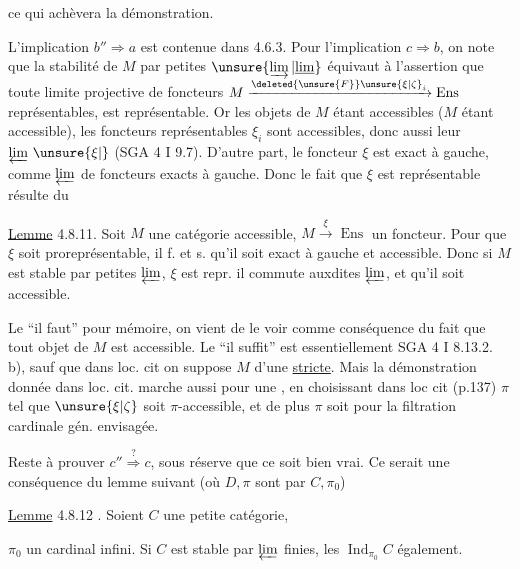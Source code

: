 ce qui achèvera la démonstration.

L'implication $b''\Longrightarrow a$ est contenue dans 4.6.3. Pour l'implication $c\Longrightarrow b$, on note que la stabilité de  $M$ par petites $\unsure{\varinjlim|\underline{\lim}}$ équivaut à l'assertion que toute  limite projective \deleted{$\unsure{\xi}$} de foncteurs $M\xrightarrow{\deleted{\unsure{F}}\unsure{\xi|\zeta}_i}\operatorname{Ens}$ représentables, est représentable. Or les objets de $M$ étant accessibles ($M$ étant accessible), les foncteurs représentables $\xi_i$ sont accessibles, donc aussi leur $\varprojlim\,\unsure{\xi|{}}$ (SGA 4 I 9.7). D'autre part, le foncteur $\xi$ est exact à gauche, comme $\varprojlim$ de foncteurs  exacts à gauche. Donc le fait que $\xi$ est représentable résulte du

\uline{Lemme} 4.8.11. Soit $M$ une catégorie accessible,   $M\xrightarrow{\xi}\operatorname{Ens}$ un foncteur. Pour que $\xi$ soit proreprésentable, il f. et s. qu'il soit exact à gauche et accessible. Donc  si $M$ est stable par petites $\varprojlim$, $\xi$ est repr.  il commute auxdites $\varprojlim$, et qu'il soit accessible.

Le ``il faut''   pour mémoire, on vient de le voir comme conséquence du fait que tout objet de $M$ est accessible. Le ``il suffit'' est essentiellement SGA 4 I 8.13.2. b), sauf que dans loc. cit on suppose $M$  d'une  \uline{stricte}. Mais la démonstration donnée dans loc. cit. marche aussi pour une , en choisissant dans loc cit (p.137) $\pi$ tel que $\unsure{\xi|\zeta}$ soit $\pi$-accessible, et de plus $\pi$ soit \uline{} pour la filtration cardinale gén. envisagée.

Reste à prouver $c''\overset{?}{\Longrightarrow}c$, sous réserve que ce soit bien vrai. Ce serait une conséquence du lemme suivant (où $D,\pi$ sont  par $C,\pi_0$)

\uline{Lemme} 4.8.12 . Soient $C$ une petite catégorie,


$\pi_0$ un cardinal infini. Si $C$ est stable par $\varprojlim$ finies, les $\operatorname{Ind}_{\pi_0}C$ également.

